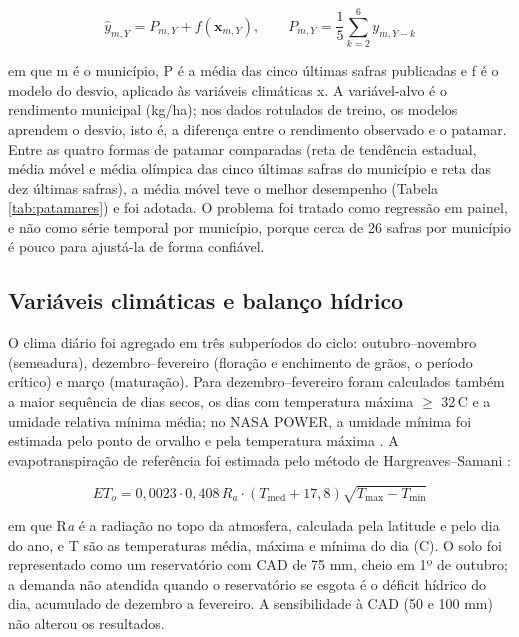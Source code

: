 \documentclass[
	article,			%
	11pt,				%
	oneside,			%
	a4paper,			%
	english,			%
	brazil,				%
	sumario=tradicional
	]{abntex2}
\begin{document}
\begin{equation}
\hat{y}_{m,Y} = P_{m,Y} + f(\mathbf{x}_{m,Y}), \qquad P_{m,Y} = \frac{1}{5}\sum_{k=2}^{6} y_{m,Y-k}
\end{equation}

em que m é o município, P é a média das cinco últimas safras publicadas e f é o modelo do desvio, aplicado às variáveis climáticas x. A variável-alvo é o rendimento municipal (kg/ha); nos dados rotulados de treino, os modelos aprendem o desvio, isto é, a diferença entre o rendimento observado e o patamar. Entre as quatro formas de patamar comparadas (reta de tendência estadual, média móvel e média olímpica das cinco últimas safras do município e reta das dez últimas safras), a média móvel teve o melhor desempenho (Tabela \ref{tab:patamares}) e foi adotada. O problema foi tratado como regressão em painel, e não como série temporal por município, porque cerca de 26 safras por município é pouco para ajustá-la de forma confiável.

\subsection{Variáveis climáticas e balanço hídrico}

O clima diário foi agregado em três subperíodos do ciclo: outubro--novembro (semeadura), dezembro--fevereiro (floração e enchimento de grãos, o período crítico) e março (maturação). Para dezembro--fevereiro foram calculados também a maior sequência de dias secos, os dias com temperatura máxima $\geq$ 32\,\textdegree C e a umidade relativa mínima média; no NASA POWER, a umidade mínima foi estimada pelo ponto de orvalho e pela temperatura máxima \cite{allen1998}. A evapotranspiração de referência foi estimada pelo método de Hargreaves--Samani \cite{hargreaves1985}:

\begin{equation}
ET_o = 0{,}0023 \cdot 0{,}408\,R_a \cdot (T_{\mathrm{med}} + 17{,}8)\sqrt{T_{\mathrm{max}} - T_{\mathrm{min}}}
\end{equation}

em que R\emph{a} é a radiação no topo da atmosfera, calculada pela latitude e pelo dia do ano, e T são as temperaturas média, máxima e mínima do dia (\textdegree{}C). O solo foi representado como um reservatório com CAD de 75 mm, cheio em 1º de outubro; a demanda não atendida quando o reservatório se esgota é o déficit hídrico do dia, acumulado de dezembro a fevereiro. A sensibilidade à CAD (50 e 100 mm) não alterou os resultados.
\end{document}
